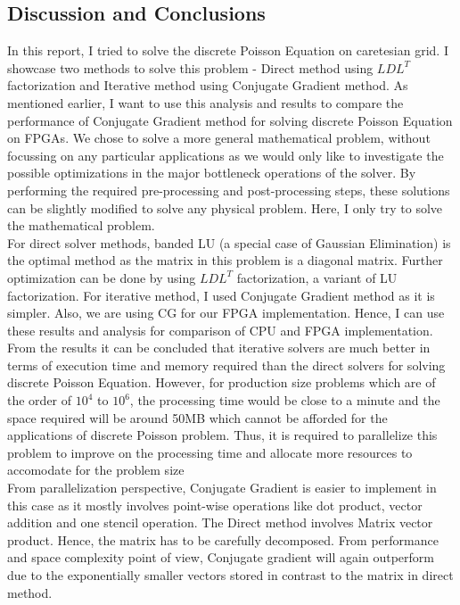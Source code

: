 \documentclass{article}
\begin{document}
\begin{spacing}{1.1}
\section{Discussion and Conclusions}
In this report, I tried to solve the discrete Poisson Equation on caretesian grid. I showcase two methods to solve this problem - Direct method using $LDL^T$ factorization and Iterative method using Conjugate Gradient method. As mentioned earlier, I want to use this analysis and results to compare the performance of Conjugate Gradient method for solving discrete Poisson Equation on FPGAs. We chose to solve a more general mathematical problem, without focussing on any particular applications as we would only like to investigate the possible optimizations in the major bottleneck operations of the solver. By performing the required pre-processing and post-processing steps, these solutions can be slightly modified to solve any physical problem. Here, I only try to solve the mathematical problem. \\

For direct solver methods, banded LU (a special case of Gaussian Elimination) is the optimal method as the matrix in this problem is a diagonal matrix. Further optimization can be done by using $LDL^T$ factorization, a variant of LU factorization. For iterative method, I used Conjugate Gradient method as it is simpler. Also, we are using CG for our FPGA implementation. Hence, I can use these results and analysis for comparison of CPU and FPGA implementation.\\

From the results it can be concluded that iterative solvers are much better in terms of execution time and memory required than the direct solvers for solving discrete Poisson Equation. However, for production size problems which are of the order of $10^4$ to $10^6$, the processing time would be close to a minute and the space required will be around 50MB which cannot be afforded for the applications of discrete Poisson problem. Thus, it is required to parallelize this problem to improve on the processing time and allocate more resources to accomodate for the problem size\\

From parallelization perspective, Conjugate Gradient is easier to implement in this case as it mostly involves point-wise operations like dot product, vector addition and one stencil operation. The Direct method involves Matrix vector product. Hence, the matrix has to be carefully decomposed. From performance and space complexity point of view, Conjugate gradient will again outperform due to the exponentially smaller vectors stored in contrast to the matrix in direct method.


\end{spacing}
\end{document}
